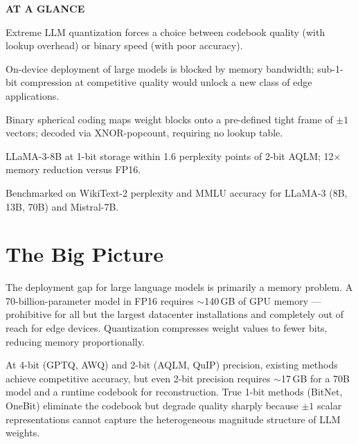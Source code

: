 \documentclass[10pt,twocolumn]{article}
\begin{document}
\begin{mdframed}[backgroundcolor=boxgray,linecolor=rulered,linewidth=1pt,
    innerleftmargin=6pt,innerrightmargin=6pt,
    innertopmargin=6pt,innerbottommargin=6pt]
\textbf{\small AT A GLANCE}\par\vspace{4pt}
\begin{description}[leftmargin=0pt,labelsep=4pt,itemsep=2pt,parsep=0pt,
    font=\small\bfseries]
  \item[Problem:] Extreme LLM quantization forces a choice between
    codebook quality (with lookup overhead) or binary speed (with
    poor accuracy).
  \item[Why it matters:] On-device deployment of large models is
    blocked by memory bandwidth; sub-1-bit compression at competitive
    quality would unlock a new class of edge applications.
  \item[Method:] Binary spherical coding maps weight blocks onto a
    pre-defined tight frame of $\pm1$ vectors; decoded via
    XNOR-popcount, requiring no lookup table.
  \item[Result:] LLaMA-3-8B at 1-bit storage within 1.6 perplexity
    points of 2-bit AQLM; 12$\times$ memory reduction versus FP16.
  \item[Evidence:] Benchmarked on WikiText-2 perplexity and MMLU
    accuracy for LLaMA-3 (8B, 13B, 70B) and Mistral-7B.
\end{description}
\end{mdframed}

\section{The Big Picture}

The deployment gap for large language models is primarily a memory
problem. A 70-billion-parameter model in FP16 requires $\sim$140\,GB
of GPU memory --- prohibitive for all but the largest datacenter
installations and completely out of reach for edge devices. Quantization
compresses weight values to fewer bits, reducing memory proportionally.

At 4-bit (GPTQ, AWQ) and 2-bit (AQLM, QuIP) precision, existing
methods achieve competitive accuracy, but even 2-bit precision requires
$\sim$17\,GB for a 70B model and a runtime codebook for reconstruction.
True 1-bit methods (BitNet, OneBit) eliminate the codebook but degrade
quality sharply because $\pm1$ scalar representations cannot capture
the heterogeneous magnitude structure of LLM weights.
\end{document}
